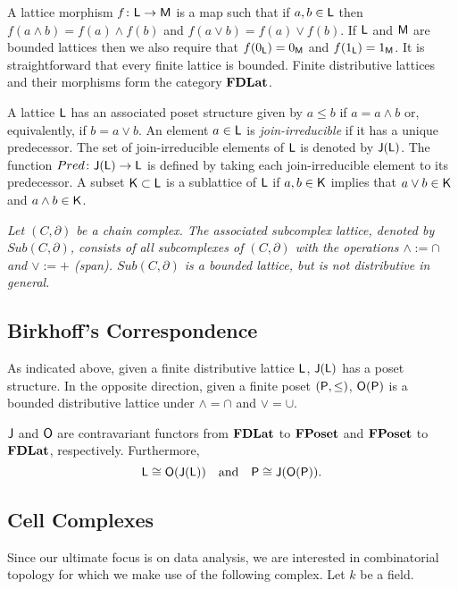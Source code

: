 A lattice morphism $f \colon {\mathsf L}\to {\mathsf M}$ is a map such that if $a,b\in {\mathsf L}$ then $f(a\wedge b) = f(a)\wedge f(b)$ and $f(a\vee b) = f(a)\vee f(b)$.  
If ${\mathsf L}$ and ${\mathsf M}$ are bounded lattices then we also require that $f(0_{\mathsf L})=0_{\mathsf M}$ and $f(1_{\mathsf L})=1_{\mathsf M}$.    
It is straightforward that every finite lattice is bounded. 
Finite distributive lattices and their morphisms form the category ${\bf FDLat}$.

A lattice ${\mathsf L}$ has an associated poset structure given by $a\leq b$ if $a=a\wedge b$ or, equivalently, if $b=a\vee b$.
An element $a\in {\mathsf L}$ is {\em join-irreducible} if it has a unique predecessor.   
The set of join-irreducible elements of ${\mathsf L}$ is denoted by ${\mathsf J}({\mathsf L})$.
The function $Pred \colon {\mathsf J}({\mathsf L})\to {\mathsf L}$ is defined by taking each join-irreducible element to its predecessor.  
A subset ${\mathsf K}\subset {\mathsf L}$ is  a sublattice of ${\mathsf L}$ if $a,b\in {\mathsf K}$ implies that $a\vee b\in {\mathsf K}$ and $a\wedge b\in {\mathsf K}$.  

\begin{ex}
{\em
Let $(C,\partial)$ be a chain complex.  
The associated \emph{subcomplex lattice}, denoted by $Sub(C,\partial)$, consists of all  subcomplexes of $(C,\partial)$ with the operations $\wedge := \cap$ and $\vee := +$ (span).
$Sub(C,\partial)$ is a bounded lattice, but  is not distributive in general.
}
\end{ex}

\subsection{Birkhoff's Correspondence}\label{sec:birkhoff}
As indicated above, given a finite distributive lattice ${\mathsf L}$,  ${\mathsf J}({\mathsf L})$ has a poset structure.
In the opposite direction, given a finite poset $({\mathsf P},\leq)$, ${\mathsf O}({\mathsf P})$ is a bounded distributive lattice under $\wedge = \cap$ and $\vee = \cup$.

\begin{thm}\label{thm:birkhoff}
${\mathsf J}$ and ${\mathsf O}$ are contravariant functors from ${\bf FDLat}$ to ${\bf FPoset}$ and ${\bf FPoset}$ to ${\bf FDLat}$, respectively.
Furthermore,
\[
{\mathsf L}\cong {\mathsf O}({\mathsf J}({\mathsf L}))\quad\text{and}\quad {\mathsf P}\cong {\mathsf J}({\mathsf O}({\mathsf P})).
\]
\end{thm}

\subsection{Cell Complexes}

Since our ultimate focus is on data analysis, we are interested in combinatorial topology for which we make use of the following complex.  Let $k$ be a field.


